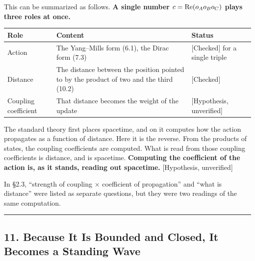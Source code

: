 \documentclass[
  a4paper,
]{article}
\newcounter{none} %
\begin{document}
This can be summarized as follows. \textbf{A single number
\(c = {\rm Re}(o_Ao_Bo_C)\) plays three roles at once.}

{\def\LTcaptype{none} %
\begin{longtable}[]{@{}
  >{\raggedright\arraybackslash}p{}
  >{\raggedright\arraybackslash}p{}
  >{\raggedright\arraybackslash}p{}@{}}
\toprule\noalign{}
\begin{minipage}[b]{\linewidth}\raggedright
Role
\end{minipage} & \begin{minipage}[b]{\linewidth}\raggedright
Content
\end{minipage} & \begin{minipage}[b]{\linewidth}\raggedright
Status
\end{minipage} \\
\midrule\noalign{}
\endhead
\bottomrule\noalign{}
\endlastfoot
Action & The Yang--Mills form (6.1), the Dirac form (7.3) &
{[}Checked{]} for a single triple \\
Distance & The distance between the position pointed to by the product
of two and the third (10.2) & {[}Checked{]} \\
Coupling coefficient & That distance becomes the weight of the update &
{[}Hypothesis, unverified{]} \\
\end{longtable}
}

The standard theory first places spacetime, and on it computes how the
action propagates as a function of distance. Here it is the reverse.
From the products of states, the coupling coefficients are computed.
What is read from those coupling coefficients is distance, and is
spacetime. \textbf{Computing the coefficient of the action is, as it
stands, reading out spacetime.} {[}Hypothesis, unverified{]}

In §2.3, ``strength of coupling × coefficient of propagation'' and
``what is distance'' were listed as separate questions, but they were
two readings of the same computation.

\begin{center}\rule{0.5\linewidth}{0.5pt}\end{center}

\subsection{11. Because It Is Bounded and Closed, It Becomes a Standing
Wave}\label{because-it-is-bounded-and-closed-it-becomes-a-standing-wave}
\end{document}
